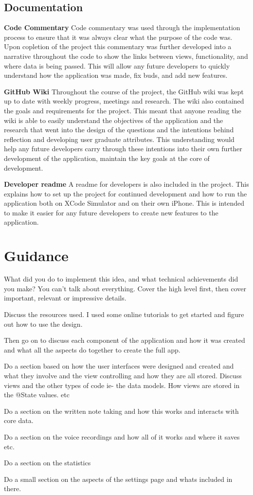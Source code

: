 \documentclass{l4proj}
\begin{document}
\subsection{Documentation}

\textbf{Code Commentary} Code commentary was used through the implementation process to ensure that it was always clear what the purpose of the code was. Upon
copletion of the project this commentary was further developed into a narrative throughout the code to show the links between views, functionality, and where
data is being passed. This will allow any future developers to quickly understand how the application was made, fix buds, and add new features.

\textbf{GitHub Wiki} Throughout the course of the project, the GitHub wiki was kept up to date with weekly progress, meetings and research. The wiki also 
contained the goals and requirements for the project. This meant that anyone reading the wiki is able to easily understand the objectives of the application
and the research that went into the design of the questions and the intentions behind reflection and developing user graduate attributes. This understanding
would help any future developers carry through these intentions into their own further development of the application, maintain the key goals at the core
of development. 

\textbf{Developer readme} A readme for developers is also included in the project. This explains how to set up the project for continued development and how
to run the application both on XCode Simulator and on their own iPhone. This is intended to make it easier for any future developers to create new features
to the application. 


\section{Guidance}

What did you do to implement this idea, and what technical achievements did you make?
You can't talk about everything. Cover the high level first, then cover important, relevant or impressive details.
\par 
Discuss the resources used. I used some online tutorials to get started and figure out how to use the design.
\par 
Then go on to discuss each component of the application and how it was created and what all the aspects do
together to create the full app. 
\par 
Do a section based on how the user interfaces were designed and created and what they involve and the view 
controlling and how they are all stored. Discuss views and the other types of code ie- the data models. How 
views are stored in the @State values. etc 
\par 
Do a section on the written note taking and how this works and interacts with core data.
\par 
Do a section on the voice recordings and how all of it works and where it saves etc.
\par 
Do a section on the statistics 
\par 
Do a small section on the aspects of the settings page and whats included in there.
\end{document}
